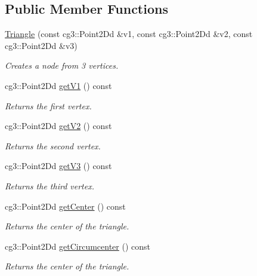 \subsection*{Public Member Functions}
\begin{DoxyCompactItemize}
\item 
\hyperlink{classTriangle_a3bb081f3c4d90284e27e1005a2b33599}{Triangle} (const cg3\+::\+Point2\+Dd \&v1, const cg3\+::\+Point2\+Dd \&v2, const cg3\+::\+Point2\+Dd \&v3)
\begin{DoxyCompactList}\small\item\em Creates a node from 3 vertices. \end{DoxyCompactList}\item 
cg3\+::\+Point2\+Dd \hyperlink{classTriangle_a488beca5f5e516f4914f7ec118d2205e}{get\+V1} () const
\begin{DoxyCompactList}\small\item\em Returns the first vertex. \end{DoxyCompactList}\item 
cg3\+::\+Point2\+Dd \hyperlink{classTriangle_a6b22d833c2cc9b738793da637642bfd0}{get\+V2} () const
\begin{DoxyCompactList}\small\item\em Returns the second vertex. \end{DoxyCompactList}\item 
cg3\+::\+Point2\+Dd \hyperlink{classTriangle_ad63dee82c3268c96bb5a6d353675c133}{get\+V3} () const
\begin{DoxyCompactList}\small\item\em Returns the third vertex. \end{DoxyCompactList}\item 
cg3\+::\+Point2\+Dd \hyperlink{classTriangle_a4d120f7288b7051a1cf442268edd328d}{get\+Center} () const
\begin{DoxyCompactList}\small\item\em Returns the center of the triangle. \end{DoxyCompactList}\item 
cg3\+::\+Point2\+Dd \hyperlink{classTriangle_a0ac42109ff92fc5b907283e10d7946b2}{get\+Circumcenter} () const
\begin{DoxyCompactList}\small\item\em Returns the center of the triangle. \end{DoxyCompactList}\end{DoxyCompactItemize}
